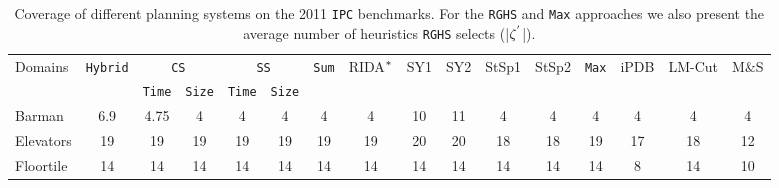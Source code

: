 \begin{table}[htb]
\footnotesize\setlength{\tabcolsep}{1.8pt}
\centering
\caption{Coverage of different planning systems on the 2011 \texttt{IPC} benchmarks. For the \texttt{RGHS} and \texttt{Max} approaches we also present the average number of heuristics \texttt{RGHS} selects (|$\zeta\sp{'}$|).}
\begin{tabular}{lccccccccccccccc}
\hline
\multirow{2}{*}{Domains} & \multirow{2}{*}{\texttt{Hybrid}} & \multicolumn{2}{c}{\texttt{CS}} & \multicolumn{2}{c}{\texttt{SS}} & \multirow{2}{*}{\texttt{Sum}} & \multirow{2}{*}{RIDA$\sp{*}$} & \multirow{2}{*}{SY1} & \multirow{2}{*}{SY2} & \multirow{2}{*}{StSp1} & \multirow{2}{*}{StSp2} & \multirow{2}{*}{\texttt{Max}} & \multirow{2}{*}{iPDB} & \multirow{2}{*}{LM-Cut} & \multirow{2}{*}{M$\&$S} \\ \cline{3-6}
                         &                                    & \texttt{Time} & \texttt{Size} & \texttt{Time} & \texttt{Size} &                                 &                       &                      &                      &                        &                        &                                 &                       &                         &                         \\ \hline
Barman                   & 6.9                                & 4.75            & 4               & 4               & 4               & 4                               & 4                     & 10                   & 11                   & 4                      & 4                      & 4                               & 4                     & 4                       & 4                       \\
Elevators                & 19                                 & 19              & 19              & 19              & 19              & 19                              & 19                    & 20                   & 20                   & 18                     & 18                     & 19                              & 17                    & 18                      & 12                      \\
Floortile                & 14                                 & 14              & 14              & 14              & 14              & 14                              & 14                    & 14                   & 14                   & 14                     & 14                     & 14                              & 8                     & 14                      & 10                      \\

\end{tabular}
\end{table}
